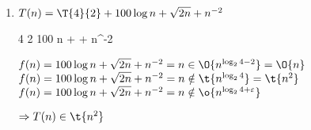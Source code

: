 \documentclass{bschlangaul-aufgabe}
\begin{document}
\begin{enumerate}

\item $T(n)= \T{4}{2} + 100 \log n + \sqrt{2n} + n^{-2}$

\begin{bAntwort}
\bMasterVariablenDeklaration
{4} %
{2} %
{100 \log n +  + n^{-2}} %

\bMasterFallRechnung
{$f(n) = 100 \log n + \sqrt{2n} + n^{-2} = n \in \O{n^{\log_2 {4 - 2}}} = \O{n}$}
{$f(n) = 100 \log n + \sqrt{2n} + n^{-2} = n \notin \t{n^{\log_2 {4}}} = \t{n^2}$}
{$f(n) = 100 \log n + \sqrt{2n} + n^{-2} = n \notin \o{n^{\log_2 {4 + \varepsilon}}}$}

$\Rightarrow T(n) \in \t{n^2}$

\end{bAntwort}

\end{enumerate}
\end{document}
